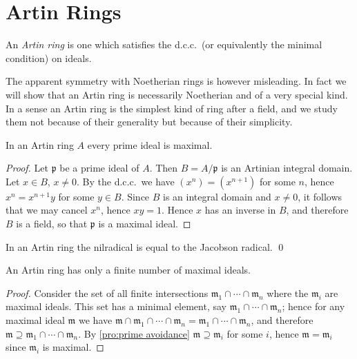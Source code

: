 \chapter{Artin Rings}\label{chapter8}

An \emph{Artin ring} is one which satisfies the d.c.c.\ (or equivalently the minimal condition) on ideals.

The apparent symmetry with Noetherian rings is however misleading. In fact we will show that an Artin ring is necessarily Noetherian and of a very special kind. In a sense an Artin ring is the simplest kind of ring after a field, and we study them not because of their generality but because of their simplicity.

\begin{proposition}\label{prop:artin-prime-maximal}
In an Artin ring $A$ every prime ideal is maximal.
\end{proposition}

\begin{proof}
Let $\mathfrak{p}$ be a prime ideal of $A$. Then $B = A/\mathfrak{p}$ is an Artinian integral domain. Let $x \in B$, $x \neq 0$. By the d.c.c.\ we have $(x^n) = (x^{n+1})$ for some $n$, hence $x^n = x^{n+1}y$ for some $y \in B$. Since $B$ is an integral domain and $x \neq 0$, it follows that we may cancel $x^n$, hence $xy = 1$. Hence $x$ has an inverse in $B$, and therefore $B$ is a field, so that $\mathfrak{p}$ is a maximal ideal.
\end{proof}

\begin{corollary}\label{cor:artin-nil-jacobson}
In an Artin ring the nilradical is equal to the Jacobson radical. \qed
\end{corollary}

\begin{proposition}\label{prop:artin-finite-maximal}
An Artin ring has only a finite number of maximal ideals.
\end{proposition}

\begin{proof}
Consider the set of all finite intersections $\mathfrak{m}_1 \cap \cdots \cap \mathfrak{m}_n$ where the $\mathfrak{m}_i$ are maximal ideals. This set has a minimal element, say $\mathfrak{m}_1 \cap \cdots \cap \mathfrak{m}_n$; hence for any maximal ideal $\mathfrak{m}$ we have $\mathfrak{m} \cap \mathfrak{m}_1 \cap \cdots \cap \mathfrak{m}_n = \mathfrak{m}_1 \cap \cdots \cap \mathfrak{m}_n$, and therefore $\mathfrak{m} \supseteq \mathfrak{m}_1 \cap \cdots \cap \mathfrak{m}_n$. By \eqref{pro:prime avoidance} $\mathfrak{m} \supseteq \mathfrak{m}_i$ for some $i$, hence $\mathfrak{m} = \mathfrak{m}_i$ since $\mathfrak{m}_i$ is maximal.
\end{proof}

